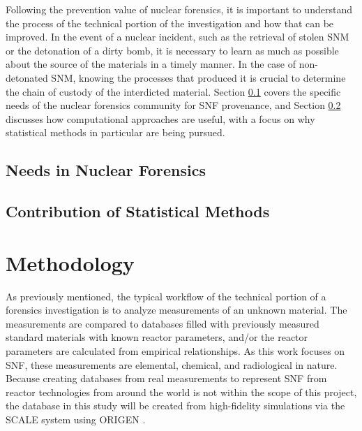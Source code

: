 Following the prevention value of nuclear forensics, it is important to
understand the process of the technical portion of the investigation and how
that can be improved.  In the event of a nuclear incident, such as the
retrieval of stolen \gls{SNM} or the detonation of a dirty bomb, it is
necessary to learn as much as possible about the source of the materials in a
timely manner. In the case of non-detonated \gls{SNM}, knowing the processes
that produced it is crucial to determine the chain of custody of the
interdicted material.  Section \ref{sec:nfneeds} covers the specific needs of
the nuclear forensics community for \gls{SNF} provenance, and Section
\ref{sec:statscontrib} discusses how computational approaches are useful, with
a focus on why statistical methods in particular are being pursued. 

\subsection{Needs in Nuclear Forensics}

\label{sec:nfneeds}

\subsection{Contribution of Statistical Methods}

\label{sec:statscontrib}

\section{Methodology}
\label{sec:methodology}

As previously mentioned, the typical workflow of the technical portion of a
forensics investigation is to analyze measurements of an unknown material. The
measurements are compared to databases filled with previously measured standard
materials with known reactor parameters, and/or the reactor parameters are
calculated from empirical relationships.  As this work focuses on \gls{SNF},
these measurements are elemental, chemical, and radiological in nature.
Because creating databases from real measurements to represent \gls{SNF} from
reactor technologies from around the world is not within the scope of this
project, the database in this study will be created from high-fidelity
simulations via the \gls{SCALE} \cite{scale} system using \gls{ORIGEN}
\cite{origen}. 


